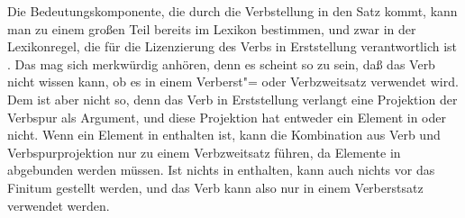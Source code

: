 Die Bedeutungskomponente, die durch die Verbstellung in den Satz kommt, kann man zu einem
großen Teil bereits im Lexikon bestimmen, und zwar in der Lexikonregel, die für die Lizenzierung
des Verbs in Erststellung verantwortlich ist \citep[]{Kiss95b}. Das mag sich merkwürdig anhören, denn es scheint
so zu sein, daß das Verb nicht wissen kann, ob es in einem Verberst"= oder Verbzweitsatz verwendet
wird. Dem ist aber nicht so, denn das Verb in Erststellung verlangt eine Projektion der Verbspur
als Argument, und diese Projektion hat entweder ein Element in \slasch oder nicht. Wenn ein Element
in \slasch enthalten ist, kann die Kombination aus Verb und Verbspurprojektion nur zu einem Verbzweitsatz
führen, da Elemente in \slasch abgebunden werden müssen. Ist nichts in \slasch enthalten, kann auch nichts
vor das Finitum gestellt werden, und das Verb kann also nur in einem Verberstsatz verwendet werden.

